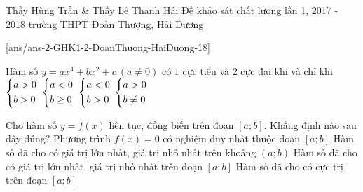 \begin{name}
{Thầy Hùng Trần \& Thầy Lê Thanh Hải}
{Đề khảo sát chất lượng lần 1, 2017 - 2018 trường THPT Đoàn Thượng, Hải Dương}
\end{name}
\setcounter{ex}{0}
[ans/ans-2-GHK1-2-DoanThuong-HaiDuong-18]
\begin{ex}%
	Hàm số $y=ax^4+bx^2+c\ (a\ne 0)$ có $1$ cực tiểu và $2$ cực đại khi và chỉ khi
	\choice
	{$\left\{\begin{aligned}&a>0\\&b>0\end{aligned}\right.$}
	{$\left\{\begin{aligned}&a<0\\&b\ge 0\end{aligned}\right.$}
	{\True $\left\{\begin{aligned}&a<0\\&b>0\end{aligned}\right.$}
	{$\left\{\begin{aligned}&a>0\\&b\ne 0\end{aligned}\right.$}
\end{ex}
\begin{ex}%
	Cho hàm số $y=f(x)$ liên tục, đồng biến trên đoạn $\left[a;b\right]$. Khẳng định nào sau đây đúng?
	\choice
	{Phương trình $f(x)=0$ có nghiệm duy nhất thuộc đoạn $\left[a;b\right]$}
	{Hàm số đã cho có giá trị lớn nhất, giá trị nhỏ nhất trên khoảng $\left(a;b\right)$}
	{\True Hàm số đã cho có giá trị lớn nhất, giá trị nhỏ nhất trên đoạn $\left[a;b\right]$}
	{Hàm số đã cho có cực trị trên đoạn $\left[a;b\right]$}
\end{ex}
